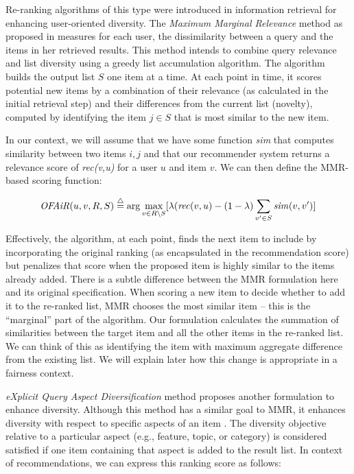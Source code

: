 Re-ranking algorithms of this type were introduced in information retrieval for enhancing user-oriented diversity. The \textit{Maximum Marginal Relevance} method as proposed in \cite{carbonell1998use} measures for each user, the dissimilarity between a query and the items in her retrieved results. This method intends to combine query relevance and list diversity using a greedy list accumulation algorithm. The algorithm builds the output list $S$ one item at a time. At each point in time, it scores potential new items by a combination of their relevance (as calculated in the initial retrieval step) and their differences from the current list (novelty), computed by identifying the item $j \in S$ that is most similar to the new item.

In our context, we will assume that we have some function \textit{sim} that computes similarity between two items $i, j$ and that our recommender system returns a relevance score of \textit{rec(v,u)} for a user $u$ and item $v$. We can then define the MMR-based scoring function:

\begin{equation}
    \mathit{OFAiR}(u,v,R,S)\buildrel\triangle\over= \arg\max_{v \in R \setminus S} [\lambda  (\mathit{rec}(v,u) - (1 - \lambda) \sum_{v' \in S} \mathit{sim}(v,v')]
\label{eq:mmr}
\end{equation}
\vspace{0.25cm}

Effectively, the algorithm, at each point, finds the next item to include by incorporating the original ranking (as encapsulated in the recommendation score) but penalizes that score when the proposed item is highly similar to the items already added. There is a subtle difference between the MMR formulation here and its original specification. When scoring a new item to decide whether to add it to the re-ranked list, MMR chooses the most similar item -- this is the ``marginal'' part of the algorithm. Our formulation calculates the summation of similarities between the target item and all the other items in the re-ranked list. We can think of this as identifying the item with maximum aggregate difference from the existing list. We will explain later how this change is appropriate in a fairness context.

\textit{eXplicit Query Aspect Diversification} method proposes another formulation to enhance diversity. Although this method has a similar goal to MMR, it enhances diversity with respect to specific aspects of an item \cite{santos2015search}. The diversity objective relative to a particular aspect (e.g., feature, topic, or category) is considered satisfied if one item containing that aspect is added to the result list. In context of recommendations, we can express this ranking score as follows:

